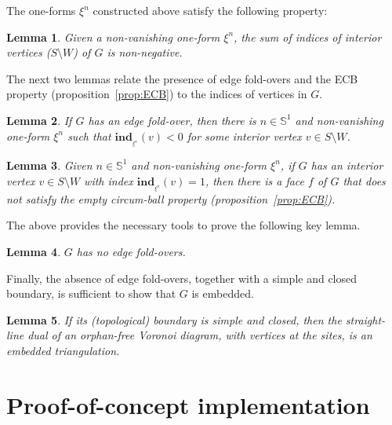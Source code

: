 \documentclass[11pt]{article}
\newtheorem{lemma}{Lemma}
\newcommand{\Sites}{S}
\begin{document}
The one-forms $\xi^n$ constructed above satisfy the following property:

\begin{lemma}\label{lem:non-negative}
	Given a non-vanishing one-form $\xi^n$, the sum of indices of interior vertices ($\Sites\setminus W$) of $G$ is non-negative. 
\end{lemma}




The next two lemmas relate the presence of edge fold-overs and 
the ECB property (proposition~\ref{prop:ECB})  to the indices of vertices in $G$. 


\begin{lemma}\label{lem:index-1}
If $G$ has an edge fold-over, then there is $n\in\mathbb{S}^1$ and non-vanishing one-form $\xi^n$ such
that $\mathbf{ind}_{_{\xi^n}}(v) < 0$ for some interior vertex $v\in \Sites\setminus W$. \end{lemma}


\begin{lemma}\label{lem:index1}
Given $n\in\mathbb{S}^1$ and non-vanishing one-form $\xi^n$, if $G$ has an interior vertex $v\in \Sites\setminus W$ with index
$\mathbf{ind}_{_{\xi^n}}(v)=1$, then there is a face $f$ of
$G$ that does not satisfy the empty circum-ball property (proposition~\ref{prop:ECB}). 
\end{lemma}

The above provides the necessary tools to prove the following key lemma. 


\begin{lemma}\label{lem:ef}
$G$ has no edge fold-overs. 
\end{lemma}



Finally, the absence of edge fold-overs, together with a simple and closed boundary, 
is sufficient to show that $G$ is 
embedded.

\begin{lemma}\label{lem:interior}
If its (topological) boundary is simple and closed, 
	then the straight-line dual of an orphan-free Voronoi diagram, 
	with vertices at the sites, 
	is an embedded triangulation. 
\end{lemma}



\section{Proof-of-concept implementation}\label{sec:implementation}
\end{document}
